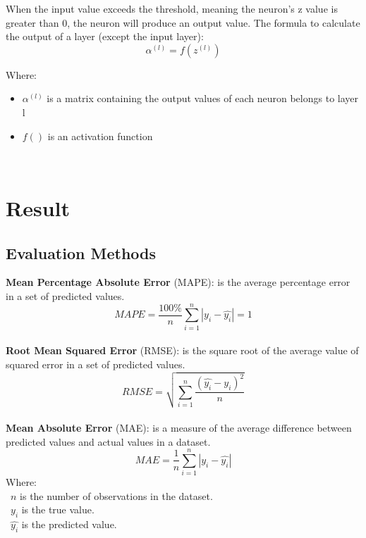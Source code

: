 \documentclass{ieeeojies}
\begin{document}
When the input value exceeds the threshold, meaning the neuron's z value is greater than 0, the neuron will produce an output value. The formula to calculate the output of a layer (except the input layer):\\

\[ \alpha^{(l)} = f(z^{(l)}) \]

Where:\\
    \begin{itemize}
        \item $\alpha^{(l)}$ is a matrix containing the output values of each neuron belongs to layer l
        \item  $f()$ is an activation function
    \end{itemize}\\
    
\section{Result}
\subsection{Evaluation Methods}
\textbf{Mean Percentage Absolute Error} (MAPE): is the average percentage error in a set of predicted values.\\
\[MAPE=\frac{100\%}{n}  \sum_{i=1}^{n} |y_i-\hat{y_i} |  = 1 \]\\
\textbf{Root Mean Squared Error} (RMSE): is the square root of the average value of squared error in a set of predicted values.\\
\[RMSE=\sqrt{\sum_{i=1}^{n} \frac{(\hat{y_i}-y_i )^2}{n} }\]\\
\textbf{Mean Absolute Error} (MAE): is a measure of the average difference between predicted values and actual values in a dataset.\\
\[MAE = \frac{1}{n} \sum_{i=1}^{n} |y_i - \hat{y_i}| \]
Where: \\
	\indent\textbullet\ \(n\) is the number of observations in the dataset.\\
	\indent\textbullet\ \(y_i\)  is the true value.\\
	\indent\textbullet\ \(\hat{y_i}\) is the predicted value.
\end{document}
